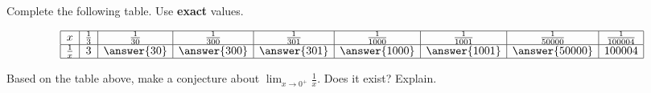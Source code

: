 \documentclass{ximera}
\author{Nela Lakos \and Kyle Parsons \and Bobby Ramsey}
\begin{document}
\begin{exercise}

Complete the following table.  Use \textbf{exact} values.

\[
\begin{array}{|c|c|c|c|c|c|c|c|c|}
\hline
x & \frac{1}{3} & \frac{1}{30} & \frac{1}{300} & \frac{1}{301} & \frac{1}{1000} & \frac{1}{1001} & \frac{1}{50000} & \frac{1}{100004}\\\hline
\frac{1}{x} & 3 & \answer{30} & \answer{300} & \answer{301} & \answer{1000} & \answer{1001} & \answer{50000} & 100004 \\\hline
\end{array}
\]

\begin{exercise}
Based on the table above, make a conjecture about $\lim_{x\to 0^{+}}\frac{1}{x}$.  Does it exist? Explain.
\begin{multipleChoice}
\end{multipleChoice}
\end{exercise}

\end{exercise}
\end{document}
